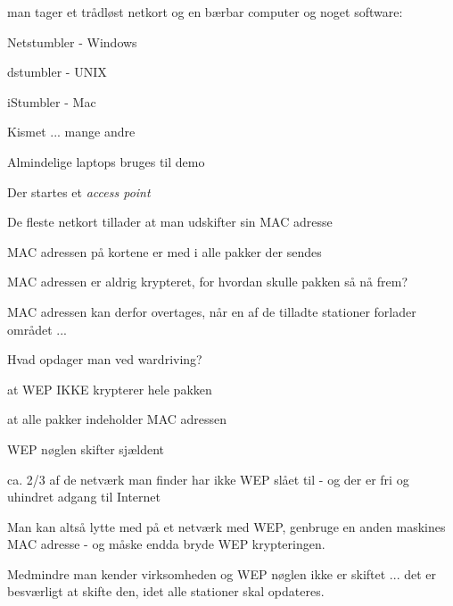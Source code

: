 \documentclass[Screen16to9,17pt]{foils}
\begin{document}


\begin{list1}
\item man tager et trådløst netkort og en bærbar computer og noget software:
\begin{list2}
\item Netstumbler - Windows 
\item dstumbler - UNIX 
\item iStumbler - Mac 
\item Kismet ... mange andre
  \end{list2}
\end{list1}



\begin{list2}
\item Almindelige laptops bruges til demo
\item Der startes et \emph{access point}
\end{list2}


\begin{list1}
\item De fleste netkort tillader at man udskifter sin MAC adresse
\item MAC adressen på kortene er med i alle pakker der sendes
\item MAC adressen er aldrig krypteret, for hvordan skulle pakken så
  nå frem?
\item MAC adressen kan derfor overtages, når en af de tilladte
  stationer forlader området ...
\end{list1}


\begin{list1}
\item Hvad opdager man ved wardriving?
\begin{list2}
\item at WEP IKKE krypterer hele pakken
\item at alle pakker indeholder MAC adressen
\item WEP nøglen skifter sjældent
\item ca. 2/3 af de netværk man finder har ikke WEP slået til - og der
  er fri og uhindret adgang til Internet
\end{list2}
\item {\color{red}
Man kan altså lytte med på et netværk med WEP, genbruge en anden
maskines MAC adresse - og måske endda bryde WEP krypteringen.}
\item
Medmindre man kender virksomheden og WEP nøglen ikke er skiftet ...
det er besværligt at skifte den, idet alle stationer skal opdateres.
\end{list1}
\end{document}
